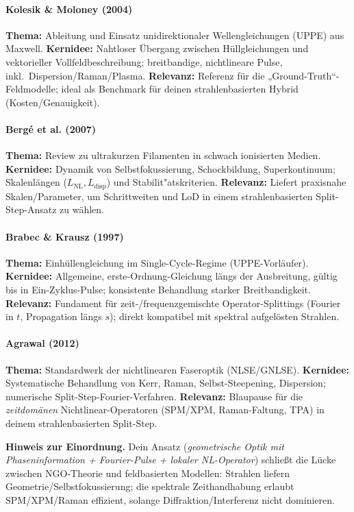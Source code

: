 \paragraph{Kolesik \& Moloney (2004) \cite{kolesik2004nonlinear}}
\textbf{Thema:} Ableitung und Einsatz unidirektionaler Wellengleichungen (UPPE) aus Maxwell.
\textbf{Kernidee:} Nahtloser Übergang zwischen Hüllgleichungen und vektorieller Vollfeldbeschreibung; breitbandige, nichtlineare Pulse, inkl.\ Disper\-sion/Raman/Plasma.
\textbf{Relevanz:} Referenz für die „Ground-Truth“-Feldmodelle; ideal als Benchmark für deinen strahlenbasierten Hybrid (Kosten/Genauigkeit).

\paragraph{Bergé et al. (2007) \cite{berge2007ultrashort}}
\textbf{Thema:} Review zu ultrakurzen Filamenten in schwach ionisierten Medien.
\textbf{Kernidee:} Dynamik von Selbstfokussierung, Schockbildung, Superkontinuum; Skalenlängen (\(L_\text{NL}, L_\text{disp}\)) und Stabilit"atskriterien.
\textbf{Relevanz:} Liefert praxisnahe Skalen/Parameter, um Schrittweiten und LoD in einem strahlenbasierten Split-Step-Ansatz zu wählen.

\paragraph{Brabec \& Krausz (1997) \cite{brabec1997singlecycle}}
\textbf{Thema:} Einhüllengleichung im Single-Cycle-Regime (UPPE-Vorläufer).
\textbf{Kernidee:} Allgemeine, erste-Ordnung-Gleichung längs der Ausbreitung, gültig bis in Ein-Zyklus-Pulse; konsistente Behandlung starker Breitbandigkeit.
\textbf{Relevanz:} Fundament für zeit-/frequenzgemischte Operator-Splittings (Fourier in \(t\), Propagation längs \(s\)); direkt kompatibel mit spektral aufgelösten Strahlen.

\paragraph{Agrawal (2012) \cite{agrawal2012nonlinear}}
\textbf{Thema:} Standardwerk der nichtlinearen Faseroptik (NLSE/GNLSE).
\textbf{Kernidee:} Systematische Behandlung von Kerr, Raman, Selbst-Steepening, Disper\-sion; numerische Split-Step-Fourier-Verfahren.
\textbf{Relevanz:} Blaupause für die \emph{zeitdomänen} Nichtlinear-Operatoren (SPM/XPM, Raman-Faltung, TPA) in deinem strahlenbasierten Split-Step.

\bigskip
\noindent\textbf{Hinweis zur Einordnung.} Dein Ansatz (\emph{geometrische Optik mit Phaseninformation + Fourier-Pulse + lokaler NL-Operator}) schließt die Lücke zwischen NGO-Theorie und feldbasierten Modellen: Strahlen liefern Geometrie/Selbstfokussierung; die spektrale Zeithandhabung erlaubt SPM/XPM/Raman effizient, solange Diffraktion/Interferenz nicht dominieren.




